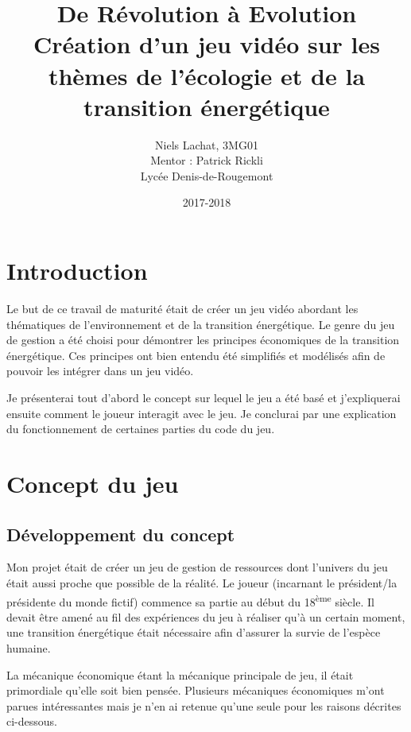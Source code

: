 \documentclass{article}
\title{De Révolution à Evolution \\ Création d'un jeu vidéo sur les thèmes de l'écologie et de la transition énergétique}
\date{2017-2018}
\author{Niels Lachat, 3MG01 \\ Mentor : Patrick Rickli \\ Lycée Denis-de-Rougemont}
\begin{document}
        \maketitle
        \newpage

        \tableofcontents
        \newpage

        \section{Introduction}
        Le but de ce travail de maturité était de créer un jeu vidéo abordant les thématiques de l'environnement et de la transition énergétique. 
        Le genre du jeu de gestion a été choisi pour démontrer les principes économiques de la transition énergétique.
        Ces principes ont bien entendu été simplifiés et modélisés afin de pouvoir les intégrer dans un jeu vidéo.
        
        
        Je présenterai tout d'abord le concept sur lequel le jeu a été basé et j'expliquerai ensuite comment le joueur interagit avec le jeu.
        Je conclurai par une explication du fonctionnement de certaines parties du code du jeu.

        \section{Concept du jeu}
        \subsection{Développement du concept}
        
        Mon projet était de créer un jeu de gestion de ressources dont l'univers du jeu était aussi proche que possible de la réalité. Le joueur (incarnant le président/la présidente du monde fictif) commence sa partie au début du 18\textsuperscript{ème} siècle. Il devait être amené au fil des expériences du jeu à réaliser qu'à un certain moment, une transition énergétique était nécessaire afin d'assurer la survie de l'espèce humaine.
        
        
        La mécanique économique étant la mécanique principale de jeu, il était primordiale qu'elle soit bien pensée.
        Plusieurs mécaniques économiques m'ont parues intéressantes mais je n'en ai retenue qu'une seule pour les raisons décrites ci-dessous.
        
\end{document}
